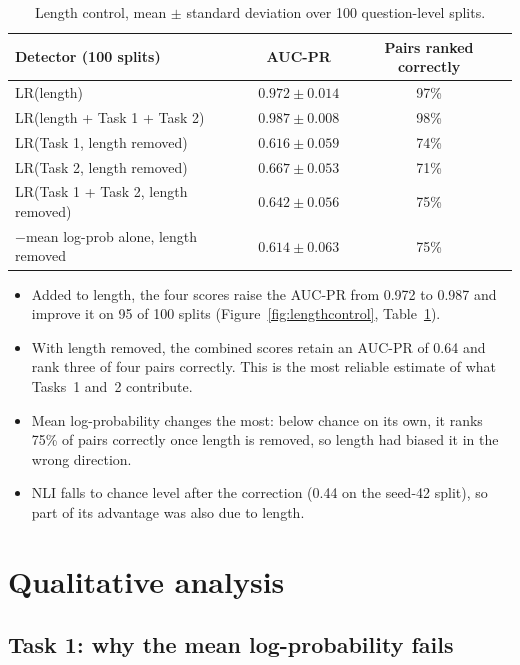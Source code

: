 \documentclass[11pt,a4paper]{article}
\begin{document}
\begin{table}[tb]
\centering\small
\begin{tabular}{lcc}
\toprule
Detector (100 splits) & AUC-PR & Pairs ranked correctly \\
\midrule
LR(length)                          & $0.972 \pm 0.014$ & 97\% \\
LR(length + Task 1 + Task 2)        & $0.987 \pm 0.008$ & 98\% \\
\midrule
LR(Task 1, length removed)          & $0.616 \pm 0.059$ & 74\% \\
LR(Task 2, length removed)          & $0.667 \pm 0.053$ & 71\% \\
LR(Task 1 + Task 2, length removed) & $0.642 \pm 0.056$ & 75\% \\
$-$mean log-prob alone, length removed & $0.614 \pm 0.063$ & 75\% \\
\bottomrule
\end{tabular}
\caption{Length control, mean $\pm$ standard deviation over 100 question-level splits.}
\label{tab:lengthcontrol}
\end{table}

\begin{itemize}
  \item Added to length, the four scores raise the AUC-PR from 0.972 to 0.987 and improve it on 95
        of 100 splits (Figure~\ref{fig:lengthcontrol}, Table~\ref{tab:lengthcontrol}).
  \item With length removed, the combined scores retain an AUC-PR of 0.64 and rank three of four
        pairs correctly. This is the most reliable estimate of what Tasks~1 and~2 contribute.
  \item Mean log-probability changes the most: below chance on its own, it ranks 75\% of pairs
        correctly once length is removed, so length had biased it in the wrong direction.
  \item NLI falls to chance level after the correction (0.44 on the seed-42 split), so part of its
        advantage was also due to length.
\end{itemize}

\section{Qualitative analysis}\label{sec:qual}

\subsection{Task 1: why the mean log-probability fails}
\end{document}

